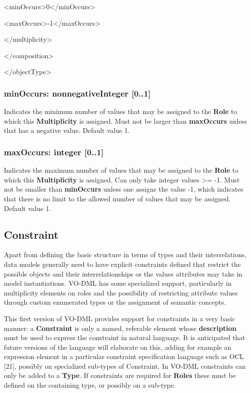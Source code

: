 \documentclass[10pt,a4paper]{ivoa}
\begin{document}
\textless minOccurs\textgreater0\textless/minOccurs\textgreater{}

\textless maxOccurs\textgreater-1\textless/maxOccurs\textgreater{}

\textless/multiplicity\textgreater{}

\textless/composition\textgreater{}

\textless/objectType\textgreater{}

\hypertarget{minoccurs-nonnegativeinteger-0..1}{%
\subsubsection{minOccurs: nonnegativeInteger
{[}0..1{]}}\label{minoccurs-nonnegativeinteger-0..1}}

Indicates the minimum number of values that may be assigned to the
\textbf{Role} to which this \textbf{Multiplicity} is assigned. Must not
be larger than \textbf{maxOccurs} unless that has a negative value.
Default value 1.

\hypertarget{maxoccurs-integer-0..1}{%
\subsubsection{maxOccurs: integer
{[}0..1{]}}\label{maxoccurs-integer-0..1}}

Indicates the maximum number of values that may be assigned to the
\textbf{Role} to which this \textbf{Multiplicity} is assigned. Can only
take integer values \textgreater= -1. Must not be smaller than
\textbf{minOccurs} unless one assigns the value -1, which indicates that
there is no limit to the allowed number of values that may be assigned.
Default value 1.

\hypertarget{constraint}{%
\subsection{Constraint}\label{constraint}}

Apart from defining the basic structure in terms of types and their
interrelations, data models generally need to have explicit constraints
defined that restrict the possible objects and their interrelationships
or the values attributes may take in model instantiations. VO-DML has
some specialized support, particularly in multiplicity elements on roles
and the possibility of restricting attribute values through custom
enumerated types or the assignment of semantic concepts.

This first version of VO-DML provides support for constraints in a very
basic manner: a \textbf{Constraint} is only a named, referable element
whose \textbf{description} must be used to express the constraint in
natural language. It is anticipated that future versions of the language
will elaborate on this, adding for example an expression element in a
particular constraint specification language such as OCL {[}21{]},
possibly on specialized sub-types of Constraint. In VO-DML constraints
can only be added to a \textbf{Type}. If constraints are required for
\textbf{Roles} these must be defined on the containing type, or possibly
on a sub-type.
\end{document}
